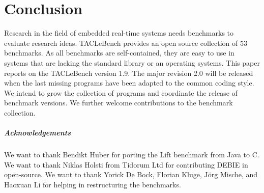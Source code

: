 \documentclass[a4paper,UKenglish]{oasics-v2016}
\newcommand{\benchcount}{53 }
\begin{document}
\section{Conclusion}
\label{sec:conclusion}

Research in the field of embedded real-time systems needs benchmarks to
evaluate research ideas. TACLeBench provides an open source collection of
\benchcount benchmarks. As all benchmarks are self-contained, they are easy to
use in systems that are lacking the standard library or an operating systems.
%
This paper reports on the TACLeBench version 1.9. The major revision
2.0 will be released when the last missing programs have been adapted
to the common coding style.
We intend to grow the collection of programs and coordinate the
release of benchmark versions.
We further welcome contributions to the benchmark collection.



\subparagraph*{Acknowledgements}

We want to thank Bendikt Huber for porting the Lift benchmark from Java to C.
We want to thank Niklas Holsti from Tidorum Ltd for contributing DEBIE in open-source.
We want to thank Yorick De Bock, Florian Kluge, J{\"o}rg Mische, and Haoxuan Li for helping in restructuring the benchmarks.



\end{document}

